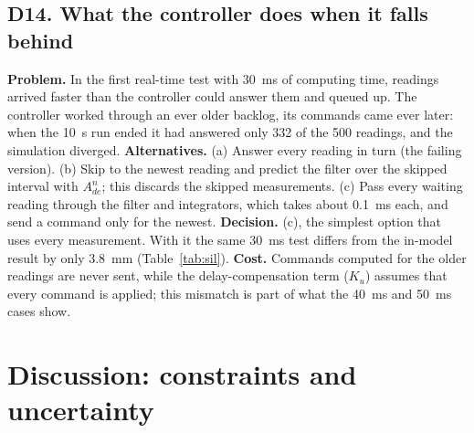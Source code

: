 \documentclass[11pt,a4paper]{article}
\begin{document}
\subsection{D14. What the controller does when it falls behind}

\textbf{Problem.} In the first real-time test with \SI{30}{ms} of computing
time, readings arrived faster than the controller could answer them and queued
up. The controller worked through an ever older backlog, its commands came ever
later: when the \SI{10}{s} run ended it had answered only 332 of the 500
readings, and the simulation diverged. \textbf{Alternatives.} (a) Answer every reading in turn (the
failing version). (b) Skip to the newest reading and predict the filter over the skipped
interval with $A_{de}^n$; this discards the skipped measurements. (c) Pass every waiting reading through the filter and integrators,
which takes about \SI{0.1}{ms} each, and send a command only for the newest.
\textbf{Decision.} (c), the simplest option that uses every measurement. With it the same \SI{30}{ms} test differs from the in-model result
by only \SI{3.8}{mm} (Table~\ref{tab:sil}). \textbf{Cost.} Commands computed for
the older readings are never sent, while the delay-compensation term
($K_u$) assumes that every command is applied; this mismatch is part of what the
\SI{40}{ms} and \SI{50}{ms} cases show.

\section{Discussion: constraints and uncertainty}
\end{document}
